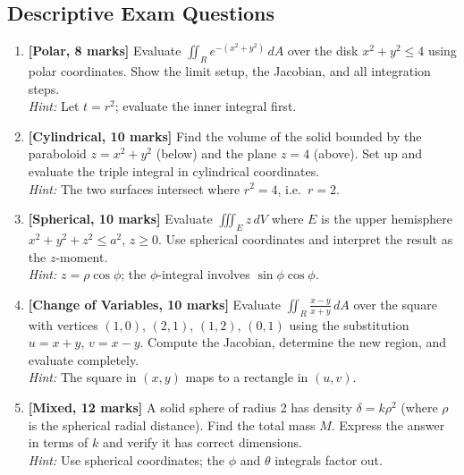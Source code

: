 \documentclass[12pt,a4paper]{article}
\begin{document}
\subsection*{Descriptive Exam Questions}

\begin{enumerate}[label=\textbf{D\arabic*.}, leftmargin=2em]

\item \textbf{[Polar, 8 marks]} Evaluate $\displaystyle\iint_R e^{-(x^2+y^2)}\,dA$ over the disk
  $x^2+y^2 \leq 4$ using polar coordinates. Show the limit setup, the Jacobian, and all integration
  steps. \\
  \textit{Hint:} Let $t = r^2$; evaluate the inner integral first.

\item \textbf{[Cylindrical, 10 marks]} Find the volume of the solid bounded by the paraboloid
  $z = x^2+y^2$ (below) and the plane $z = 4$ (above). Set up and evaluate the triple integral in
  cylindrical coordinates. \\
  \textit{Hint:} The two surfaces intersect where $r^2 = 4$, i.e.\ $r = 2$.

\item \textbf{[Spherical, 10 marks]} Evaluate $\displaystyle\iiint_E z\,dV$ where $E$ is the
  upper hemisphere $x^2+y^2+z^2 \leq a^2$, $z \geq 0$. Use spherical coordinates and interpret
  the result as the $z$-moment. \\
  \textit{Hint:} $z = \rho\cos\phi$; the $\phi$-integral involves $\sin\phi\cos\phi$.

\item \textbf{[Change of Variables, 10 marks]} Evaluate $\displaystyle\iint_R \frac{x-y}{x+y}\,dA$
  over the square with vertices $(1,0)$, $(2,1)$, $(1,2)$, $(0,1)$ using the substitution
  $u = x+y$, $v = x-y$. Compute the Jacobian, determine the new region, and evaluate completely. \\
  \textit{Hint:} The square in $(x,y)$ maps to a rectangle in $(u,v)$.

\item \textbf{[Mixed, 12 marks]} A solid sphere of radius 2 has density $\delta = k\rho^2$ (where
  $\rho$ is the spherical radial distance). Find the total mass $M$. Express the answer in terms of
  $k$ and verify it has correct dimensions. \\
  \textit{Hint:} Use spherical coordinates; the $\phi$ and $\theta$ integrals factor out.

\end{enumerate}
\end{document}
